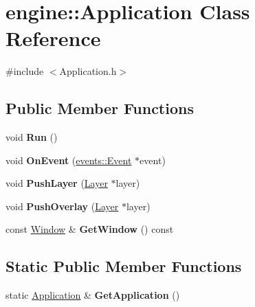 \hypertarget{classengine_1_1Application}{}\section{engine\+:\+:Application Class Reference}
\label{classengine_1_1Application}


{\ttfamily \#include $<$Application.\+h$>$}

\subsection*{Public Member Functions}
\begin{DoxyCompactItemize}
\item
\mbox{\label{classengine_1_1Application_a4dcdf08d920f7f63013a25cb1e80438b}}
void {\bfseries Run} ()
\item
\mbox{\label{classengine_1_1Application_a093e14152fc1eda1b5eba682a2b4afd9}}
void {\bfseries On\+Event} (\hyperlink{classengine_1_1events_1_1Event}{events\+::\+Event} $\ast$event)
\item
\mbox{\label{classengine_1_1Application_adb129a86a6cdbd80b25094d08605d213}}
void {\bfseries Push\+Layer} (\hyperlink{classengine_1_1Layer}{Layer} $\ast$layer)
\item
\mbox{\label{classengine_1_1Application_a00041c455b5699665d21662be95abd85}}
void {\bfseries Push\+Overlay} (\hyperlink{classengine_1_1Layer}{Layer} $\ast$layer)
\item
\mbox{\label{classengine_1_1Application_a0c66a3ff294bcc497bb2e8eb7330124c}}
const \hyperlink{classengine_1_1Window}{Window} \& {\bfseries Get\+Window} () const
\end{DoxyCompactItemize}
\subsection*{Static Public Member Functions}
\begin{DoxyCompactItemize}
\item
\mbox{\label{classengine_1_1Application_a639cdab87d3c5a14d0a9e9203d6c7c97}}
static \hyperlink{classengine_1_1Application}{Application} \& {\bfseries Get\+Application} ()
\end{DoxyCompactItemize}


